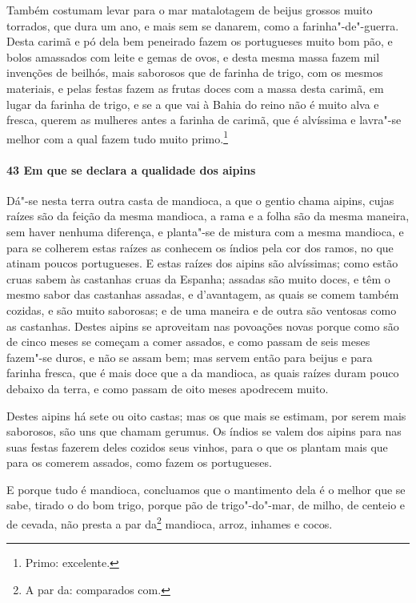 Também costumam levar para o mar matalotagem de beijus grossos muito torrados, que dura um
ano, e mais sem se danarem, como a farinha"-de"-guerra. Desta carimã e pó dela bem peneirado
fazem os portugueses muito bom pão, e bolos amassados com leite e gemas de ovos, e desta
mesma massa fazem mil invenções de beilhós, mais saborosos que de farinha de trigo, com os
mesmos materiais, e pelas festas fazem as frutas doces com a
massa desta carimã, em lugar da farinha de trigo, e se a que vai à Bahia do reino não é
muito alva e fresca, querem as mulheres antes a farinha de carimã, que é alvíssima e
lavra"-se melhor com a qual fazem tudo muito primo.\footnote{ Primo: excelente.}

\paragraph{43 Em que se declara a qualidade dos aipins}

Dá"-se nesta terra outra casta de mandioca, a que o gentio chama aipins, cujas raízes são
da feição da mesma mandioca, a rama e a folha são da mesma maneira, sem haver nenhuma
diferença, e planta"-se de mistura com a mesma mandioca, e para se colherem estas raízes as
conhecem os índios pela cor dos ramos, no que atinam poucos portugueses. E estas raízes
dos aipins são alvíssimas; como estão cruas sabem às castanhas cruas da Espanha; assadas
são muito doces, e têm o mesmo sabor das castanhas assadas, e d'avantagem, as quais se
comem também cozidas, e são muito saborosas; e de uma maneira e de outra são ventosas como
as castanhas. Destes aipins se aproveitam nas povoações novas porque como são de cinco
meses se começam a comer assados, e como passam de seis meses fazem"-se duros, e não se
assam bem; mas servem então para beijus e para farinha fresca, que é mais doce que a da
mandioca, as quais raízes duram pouco debaixo da terra, e como passam de oito meses
apodrecem muito.

Destes aipins há sete ou oito castas; mas os que mais se estimam, por serem mais
saborosos, são uns que chamam gerumus. Os índios se valem dos aipins para nas suas festas
fazerem deles cozidos seus vinhos, para o que os plantam mais que para os comerem assados,
como fazem os portugueses.

E porque tudo é mandioca, concluamos que o mantimento dela é o melhor que se sabe, tirado
o do bom trigo, porque pão de trigo"-do"-mar, de milho, de centeio e de cevada, não presta a
par da\footnote{ A par da: comparados com.} mandioca, arroz, inhames e cocos.

